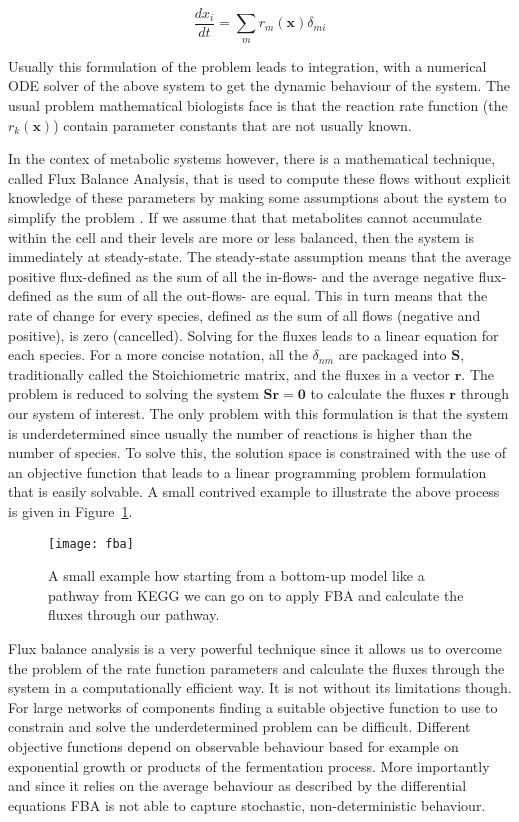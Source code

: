 \begin{equation*}
\frac{dx_i}{dt} = \sum_{m} r_m(\mathbf{x})\delta_{mi}
\end{equation*}

Usually this formulation of the problem leads to integration, with a
numerical ODE solver of the above system to get the dynamic behaviour
of the system. The usual problem mathematical biologists face is that
the reaction rate function (the $r_k(\mathbf{x})$) contain parameter
constants that are not usually known.

In the contex of metabolic systems however, there is a mathematical technique, called Flux Balance
Analysis, that is used to compute these flows without explicit
knowledge of these parameters by making some assumptions about the
system to simplify the problem \cite [] {orth2010flux}. If we assume that that metabolites
cannot accumulate within the cell and their levels are more or less
balanced, then the system is immediately at steady-state. The steady-state assumption means that the average positive flux-defined as the sum of
all the in-flows- and the average negative flux-defined as the sum of
all the out-flows- are equal. This in turn means that the rate of
change for every species, defined as the sum of all flows (negative and
positive), is zero (cancelled). Solving for the fluxes leads to a linear equation for each
species. For a more concise notation, all the $\delta_{nm}$ are
packaged into $\mathbf{S}$, traditionally called the Stoichiometric
matrix, and the fluxes in a vector $\mathbf{r}$. The problem
is reduced to solving the system $\mathbf{Sr} = \mathbf{0}$ to calculate the
fluxes $\mathbf{r}$ through our system of interest. The only problem
with this formulation is that the system is
underdetermined since usually the number of reactions is higher than
the number of species. To solve this, the solution space is constrained
with the use of an objective function that leads to a linear
programming problem formulation that is easily solvable. A small
contrived example to illustrate the above process is given in
Figure~\ref{fig:fba}.

\begin{figure}[htbp!]
\centering
\texttt{[image: fba]}
\caption[Flux Balance analysis]{A small example how starting from a
  bottom-up model like a pathway from KEGG we can go on to apply FBA
  and calculate the fluxes through our pathway.}
\label{fig:fba}
\end{figure}

Flux balance analysis is a very powerful technique since it allows us
to overcome the problem of the rate function parameters and calculate the
fluxes through the system in a computationally efficient way. It is
not without its limitations though. For large networks of components
finding a suitable objective function to use to constrain and solve
the underdetermined problem can be difficult. Different objective
functions depend on observable behaviour based for example on
exponential growth or products of the fermentation process. More importantly and
since it relies on the average behaviour as described by the
differential equations FBA is not able to capture stochastic,
non-deterministic behaviour.

